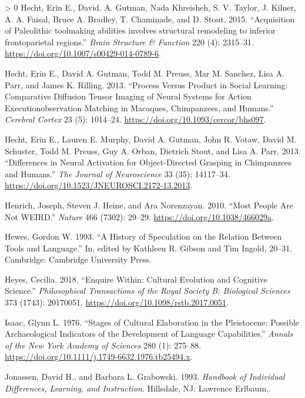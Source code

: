 \documentclass[smallextended]{svjour3}       %
\newlength{\cslhangindent}
\newenvironment{CSLReferences}[3] %
 {%
  \setlength{\parindent}{0pt}
  \ifodd #1 \everypar{\setlength{\hangindent}{\cslhangindent}}\ignorespaces\fi
  \ifnum #2 > 0
  \setlength{\parskip}{#3\baselineskip}
  \fi
 }%
 {}
\begin{document}
\begin{CSLReferences}{1}{0}
\leavevmode\hypertarget{ref-hecht2015a}{}%
Hecht, Erin E., David. A. Gutman, Nada Khreisheh, S. V. Taylor, J.
Kilner, A. A. Faisal, Bruce A. Bradley, T. Chaminade, and D. Stout.
2015. {``Acquisition of Paleolithic toolmaking abilities involves
structural remodeling to inferior frontoparietal regions.''} \emph{Brain
Structure \& Function} 220 (4): 2315--31.
\url{https://doi.org/10.1007/s00429-014-0789-6}.

\leavevmode\hypertarget{ref-hecht2013a}{}%
Hecht, Erin E., David A. Gutman, Todd M. Preuss, Mar M. Sanchez, Lisa A.
Parr, and James K. Rilling. 2013. {``Process Versus Product in Social
Learning: Comparative Diffusion Tensor Imaging of Neural Systems for
Action Execution{{}}observation Matching in Macaques, Chimpanzees, and
Humans.''} \emph{Cerebral Cortex} 23 (5): 1014--24.
\url{https://doi.org/10.1093/cercor/bhs097}.

\leavevmode\hypertarget{ref-hecht2013b}{}%
Hecht, Erin E., Lauren E. Murphy, David A. Gutman, John R. Votaw, David
M. Schuster, Todd M. Preuss, Guy A. Orban, Dietrich Stout, and Lisa A.
Parr. 2013. {``Differences in Neural Activation for Object-Directed
Grasping in Chimpanzees and Humans.''} \emph{The Journal of
Neuroscience} 33 (35): 14117--34.
\url{https://doi.org/10.1523/JNEUROSCI.2172-13.2013}.

\leavevmode\hypertarget{ref-henrich2010}{}%
Henrich, Joseph, Steven J. Heine, and Ara Norenzayan. 2010. {``Most
People Are Not WEIRD.''} \emph{Nature} 466 (7302): 29--29.
\url{https://doi.org/10.1038/466029a}.

\leavevmode\hypertarget{ref-hewes1993}{}%
Hewes, Gordon W. 1993. {``A History of Speculation on the Relation
Between Tools and Language.''} In, edited by Kathleen R. Gibson and Tim
Ingold, 20--31. Cambridge: Cambridge University Press.

\leavevmode\hypertarget{ref-heyes2018}{}%
Heyes, Cecilia. 2018. {``Enquire Within: Cultural Evolution and
Cognitive Science.''} \emph{Philosophical Transactions of the Royal
Society B: Biological Sciences} 373 (1743): 20170051.
\url{https://doi.org/10.1098/rstb.2017.0051}.

\leavevmode\hypertarget{ref-isaac1976}{}%
Isaac, Glynn L. 1976. {``Stages of Cultural Elaboration in the
Pleistocene: Possible Archaeological Indicators of the Development of
Language Capabilities.''} \emph{Annals of the New York Academy of
Sciences} 280 (1): 275--88.
\url{https://doi.org/10.1111/j.1749-6632.1976.tb25494.x}.

\leavevmode\hypertarget{ref-jonassen1993}{}%
Jonassen, David H., and Barbara L. Grabowski. 1993. \emph{Handbook of
Individual Differences, Learning, and Instruction}. Hillsdale, NJ:
Lawrence Erlbaum,.


\end{CSLReferences}
\end{document}
